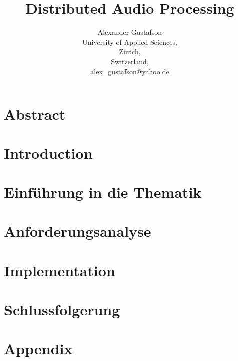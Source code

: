 \documentclass{report}
\title{Distributed Audio Processing}
\author{Alexander Gustafson\\
  University of Applied Sciences,\\
  Zürich,\\
  Switzerland,\\
  alex\_gustafson@yahoo.de}
\date{\parbox{\linewidth}{\centering%
  \today\endgraf\bigskip
  Dozent: Alexander Herrigel (alexander.herrigel@gmail.com)\endgraf\bigskip
  School of Engineering, Abteilung Zürich \endgraf
  Studiengang Informatik\endgraf
  }}
\begin{document}
\maketitle

\chapter*{Abstract}



\tableofcontents

\chapter{Introduction}



\chapter{Einführung in die Thematik}






\chapter{Anforderungsanalyse}







\chapter{Implementation}













\chapter{Schlussfolgerung }



{}


\chapter{Appendix}


\end{document}
